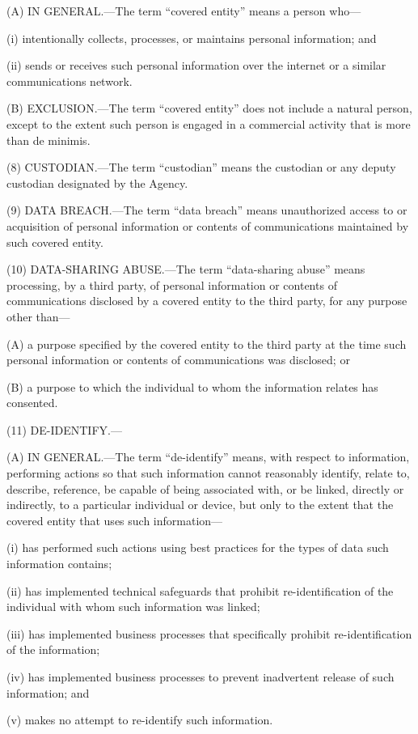 (A) IN GENERAL.—The term “covered entity” means a person who—

(i) intentionally collects, processes, or maintains personal information; and

(ii) sends or receives such personal information over the internet or a similar communications network.

(B) EXCLUSION.—The term “covered entity” does not include a natural person, except to the extent such person is engaged in a commercial activity that is more than de minimis.

(8) CUSTODIAN.—The term “custodian” means the custodian or any deputy custodian designated by the Agency.

(9) DATA BREACH.—The term “data breach” means unauthorized access to or acquisition of personal information or contents of communications maintained by such covered entity.

(10) DATA-SHARING ABUSE.—The term “data-sharing abuse” means processing, by a third party, of personal information or contents of communications disclosed by a covered entity to the third party, for any purpose other than—

(A) a purpose specified by the covered entity to the third party at the time such personal information or contents of communications was disclosed; or

(B) a purpose to which the individual to whom the information relates has consented.

(11) DE-IDENTIFY.—

(A) IN GENERAL.—The term “de-identify” means, with respect to information, performing actions so that such information cannot reasonably identify, relate to, describe, reference, be capable of being associated with, or be linked, directly or indirectly, to a particular individual or device, but only to the extent that the covered entity that uses such information—

(i) has performed such actions using best practices for the types of data such information contains;

(ii) has implemented technical safeguards that prohibit re-identification of the individual with whom such information was linked;

(iii) has implemented business processes that specifically prohibit re-identification of the information;

(iv) has implemented business processes to prevent inadvertent release of such information; and

(v) makes no attempt to re-identify such information.

